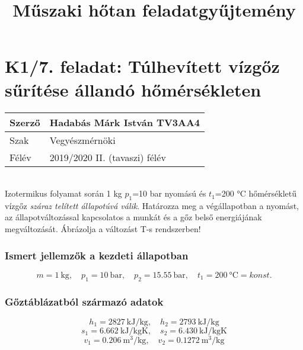 \documentclass[11pt, a4paper]{report}
\author{}
\title{Műszaki hőtan feladatgyűjtemény}
\begin{document}
	\section*{K1/7. feladat: Túlhevített vízgőz sűrítése állandó hőmérsékleten}
		\begin{tabular}{ | p{2cm} | p{14cm} | } 
			\hline
			Szerző & Hadabás Márk István TV3AA4 \\ 
			\hline
			Szak & Vegyészmérnöki \\ 
			\hline
			Félév & 2019/2020 II. (tavaszi) félév \\ 
			\hline
		\end{tabular}
			\vspace{0.5cm} 		
			\\
		Izotermikus folyamat során 1 kg $p_1$=10 bar nyomású és $t_1$=200 °C hőmérsékletű vízgőz \textit{száraz telített állapotúvá válik}. Határozza meg a végállapotban a nyomást, az állapotváltozással kapcsolatos a munkát és a  gőz belső energiájának megváltozását. Ábrázolja a változást T-s rendszerben! \\
		\subsubsection{Ismert jellemzők a kezdeti állapotban} 
			\begin{equation*}
				m= \SI{1}{\kilogram}, 
				\quad
				p_1= \SI{10}{\bar},
				\quad
				p_2= \SI{15,55}{\bar},
				\quad
				t_1=\SI{200}{\celsius} = konst.
			\end{equation*}
		\subsubsection{Gőztáblázatból származó adatok}
			\begin{equation*}
				h_1 = \SI{2827}{\kilo\joule\per\kilogram}, 
				\quad
				h_2= \SI{2793}{\kilo\joule\per\kilogram}
			\end{equation*}
			\begin{equation*}
				s_1 = \SI{6,662}{\kilo\joule\per\kilogram\kelvin},
				\quad
				s_2 = \SI{6,430}{\kilo\joule\per\kilogram\kelvin}
			\end{equation*}
			\begin{equation*}
				v_1 = \SI{0,206}{\meter\cubed\per\kilogram},
				\quad
				v_2 = \SI{0,1272}{\meter\cubed\per\kilogram}
			\end{equation*}
			\noindent\hrulefill
\end{document}

